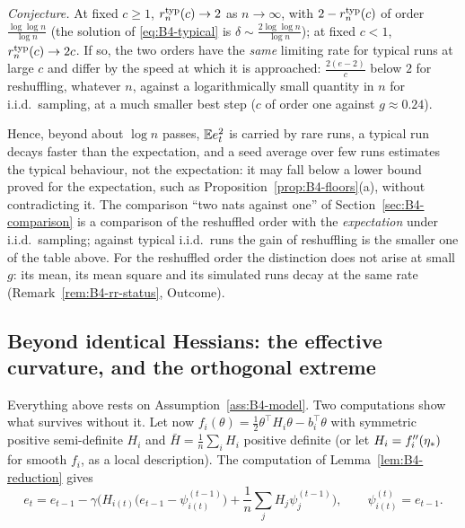 \emph{Conjecture.} At fixed $c\ge1$, $r^{\rm typ}_n(c)\to2$ as $n\to\infty$, with $2-r^{\rm typ}_n(c)$ of order $\frac{\log\log n}{\log n}$ (the solution of \eqref{eq:B4-typical} is $\delta\sim\frac{2\log\log n}{\log n}$); at fixed $c<1$, $r^{\rm typ}_n(c)\to2c$. If so, the two orders have the \emph{same} limiting rate for typical runs at large $c$ and differ by the speed at which it is approached: $\frac{2(e-2)}c$ below $2$ for reshuffling, whatever $n$, against a logarithmically small quantity in $n$ for i.i.d.\ sampling, at a much smaller best step ($c$ of order one against $g\approx0.24$).

Hence, beyond about $\log n$ passes, $\mathbb{E} e_t^2$ is carried by rare runs, a typical run decays faster than the expectation, and a seed average over few runs estimates the typical behaviour, not the expectation: it may fall below a lower bound proved for the expectation, such as Proposition~\ref{prop:B4-floors}(a), without contradicting it. The comparison ``two nats against one'' of Section~\ref{sec:B4-comparison} is a comparison of the reshuffled order with the \emph{expectation} under i.i.d.\ sampling; against typical i.i.d.\ runs the gain of reshuffling is the smaller one of the table above. For the reshuffled order the distinction does not arise at small $g$: its mean, its mean square and its simulated runs decay at the same rate (Remark~\ref{rem:B4-rr-status}, Outcome).

\subsection{Beyond identical Hessians: the effective curvature, and the orthogonal extreme}\label{sec:B4-beyond}

Everything above rests on Assumption~\ref{ass:B4-model}. Two computations show what survives without it. Let now $f_i(\theta)=\frac12\theta^\top H_i\theta-b_i^\top\theta$ with symmetric positive semi-definite $H_i$ and $\bar H=\frac1n\sum_iH_i$ positive definite (or let $H_i=f_i''(\eta_\ast)$ for smooth $f_i$, as a local description). The computation of Lemma~\ref{lem:B4-reduction} gives
\begin{equation}\label{eq:B4-general}
e_t=e_{t-1}-\gamma\Big(H_{i(t)}\big(e_{t-1}-\psi^{(t-1)}_{i(t)}\big)+\frac1n\sum_jH_j\psi_j^{(t-1)}\Big),\qquad\psi^{(t)}_{i(t)}=e_{t-1}.
\end{equation}


